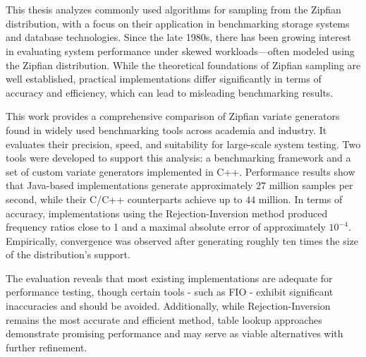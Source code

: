 \chapter{\abstractname}
This thesis analyzes commonly used algorithms for sampling from the Zipfian distribution, 
with a focus on their application in benchmarking storage systems and database technologies. 
Since the late 1980s, there has been growing interest in evaluating system performance under skewed workloads—often modeled 
using the Zipfian distribution. While the theoretical foundations of Zipfian sampling are well established, practical implementations
 differ significantly in terms of accuracy and efficiency, which can lead to misleading benchmarking results.

 This work provides a comprehensive comparison of Zipfian variate generators found in widely used benchmarking tools 
 across academia and industry. It evaluates their precision, speed, and suitability for large-scale system testing. 
 Two tools were developed to support this analysis: a benchmarking framework and a set of custom variate generators implemented in C++. 
 Performance results show that Java-based implementations generate approximately $27$ million samples per second, while their C/C++ counterparts 
 achieve up to $44$ million. In terms of accuracy, implementations using the Rejection-Inversion method produced frequency ratios close to 1 and 
 a maximal absolute error of approximately $10^{-4}$. Empirically, convergence was observed after generating roughly ten times the size of the distribution’s support.

 The evaluation reveals that most existing implementations are adequate for performance testing, though certain tools - such as FIO - 
 exhibit significant inaccuracies and should be avoided. Additionally, while Rejection-Inversion remains the most accurate and efficient method, 
 table lookup approaches demonstrate promising performance and may serve as viable alternatives with further refinement.